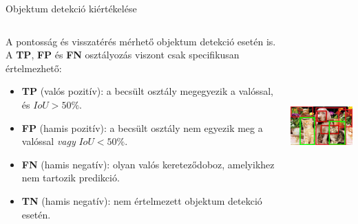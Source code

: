 \documentclass[english, aspectratio=169]{beamer}
\begin{document}
	\begin{frame}{Objektum detekció kiértékelése}
		\begin{columns}
			\begin{column}{.65\textwidth}
				A pontosság és visszatérés mérhető objektum detekció esetén is. A \textbf{TP}, \textbf{FP} és \textbf{FN} osztályozás viszont csak specifikusan értelmezhető:
				\begin{itemize}
					\item \textbf{TP} (valós pozitív): a becsült osztály megegyezik a valóssal, és $IoU>50\%$.
					\item \textbf{FP} (hamis pozitív): a becsült osztály nem egyezik meg a valóssal \emph{vagy} $IoU<50\%$.
					\item \textbf{FN} (hamis negatív): olyan valós kereteződoboz, amelyikhez nem tartozik predikció.
					\item \textbf{TN} (hamis negatív): nem értelmezett objektum detekció esetén.
				\end{itemize}
			\end{column}
			\begin{column}{.35\textwidth}
				\begin{center}
					\includegraphics[height=7cm, width=5cm, keepaspectratio]{images/od_8.png}
				\end{center}
			\end{column}
		\end{columns}
	\end{frame}
	
\end{document}
